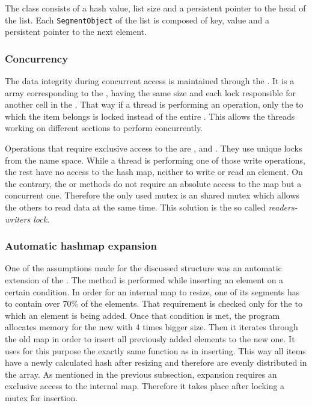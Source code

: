         The \Segment class consists of a hash value, list size and a persistent pointer to the head of the list.  
        Each \texttt{SegmentObject} of the list is composed of key, value and a persistent pointer to the next element.
        
    \subsubsection{Concurrency} %
        The data integrity during concurrent access is maintained through the \ArrayOfMutex. 
        It is a array corresponding to the \ArrayOfSegments, having the same size and each lock responsible for another cell in the \ArrayOfSegments. 
        That way if a thread is performing an operation, only the \ArrayOfSegments to which the item belongs is locked instead of the entire \NvmHashMap. 
        This allows the threads working on different sections to perform concurrently. 
        
        
        Operations that require exclusive access to the \ArrayOfSegments are \insertMethod, \removeMethod and \expandMethod.
        They use unique locks from the \std name space. 
        While a thread is performing one of those write operations, the rest have no access to the hash map, neither to write or read an element. 
        On the contrary, the \getMethod or \iterateMethod methods do not require an absolute access to the map but a concurrent one. 
        Therefore the only used mutex is an \std shared mutex which allows the others to read data at the same time. 
        This solution is the so called \textit{readers-writers lock}. 
        
    \subsubsection{Automatic hashmap expansion}
        One of the assumptions made for the discussed structure was an automatic extension of the \ArrayOfSegments. 
        The \expandMethod method is performed while inserting an element on a certain condition. 
        In order for an internal map to resize, one of its segments has to contain over 70\% of the elements. 
        That requirement is checked only for the \Segment to which an element is being added. 
        Once that condition is met, the program allocates memory for the new \ArrayOfSegments with 4 times bigger size. 
        Then it iterates through the old map in order to insert all previously added elements to the new one. 
        It uses for this purpose the exactly same function as in inserting. 
        This way all items have a newly calculated hash after resizing and therefore are evenly distributed in the array. 
        As mentioned in the previous subsection, expansion requires an exclusive access to the internal map. Therefore it takes place  after locking a mutex for insertion.

